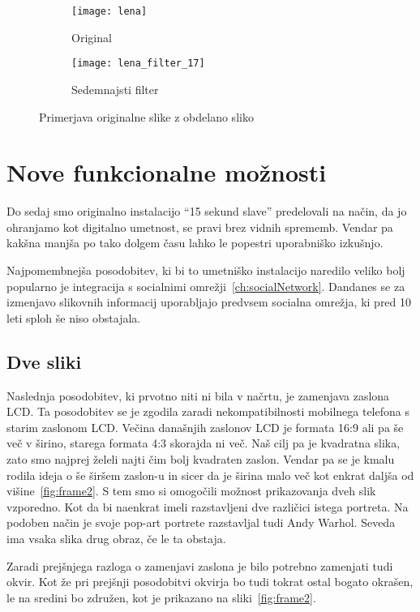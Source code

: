 \begin{figure}[!ht]
    \centering
    \begin{subfigure}[b]{0.4\textwidth}
        \texttt{[image: lena]}
        \caption{Original}
    \end{subfigure}
    \begin{subfigure}[b]{0.4\textwidth}
        \texttt{[image: lena\_filter\_17]}
        \caption{Sedemnajsti filter}
    \end{subfigure}
    \caption{Primerjava originalne slike z obdelano sliko}
    \label{fig:lena_filter_17}
\end{figure}


\chapter{Nove funkcionalne možnosti}
\label{ch:novosti}
Do sedaj smo originalno instalacijo ``15 sekund slave'' predelovali na način,
da jo ohranjamo kot digitalno umetnost, se pravi brez vidnih sprememb. Vendar
pa kakšna manjša po tako dolgem času lahko le popestri uporabniško izkušnjo.

Najpomembnejša posodobitev, ki bi to umetniško instalacijo naredilo veliko
bolj popularno je integracija s socialnimi omrežji~\ref{ch:socialNetwork}. Dandanes se za izmenjavo slikovnih informacij uporabljajo predvsem socialna omrežja, ki pred 10 leti sploh še niso obstajala.


\section{Dve sliki}
Naslednja posodobitev, ki prvotno niti ni bila v načrtu, je zamenjava zaslona
LCD. Ta posodobitev se je zgodila zaradi nekompatibilnosti mobilnega telefona
s starim zaslonom LCD. Večina današnjih zaslonov LCD je formata 16:9 ali pa še več v
širino, starega formata 4:3 skorajda ni več. Naš cilj pa je kvadratna slika, zato smo najprej želeli najti čim bolj kvadraten zaslon. Vendar pa se je kmalu
rodila ideja o še širšem zaslon-u in sicer da je širina malo več kot enkrat
daljša od višine~\ref{fig:frame2}. S tem smo si omogočili možnost prikazovanja
dveh slik vzporedno. Kot da bi naenkrat imeli razstavljeni dve različici istega portreta. Na podoben način je svoje pop-art portrete razstavljal tudi Andy Warhol.
Seveda ima vsaka slika drug obraz, če le ta obstaja.

Zaradi prejšnjega razloga o zamenjavi zaslona je bilo potrebno zamenjati tudi
okvir. Kot že pri prejšnji posodobitvi okvirja bo tudi tokrat ostal bogato
okrašen, le na sredini bo združen, kot je prikazano na sliki~\ref{fig:frame2}.

